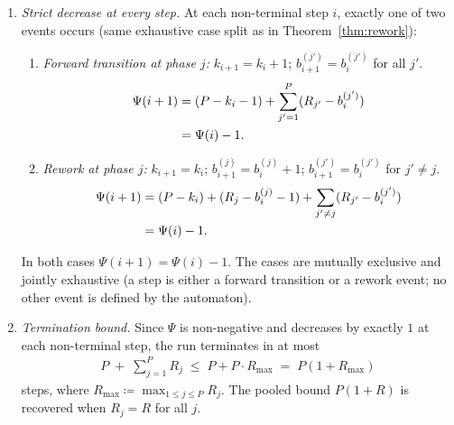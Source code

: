\documentclass[12pt]{article}
\theoremstyle{definition}
\begin{document}
\begin{enumerate}
    \item \emph{Strict decrease at every step.}
          At each non-terminal step $i$, exactly one of two events
          occurs (same exhaustive case split as in
          Theorem~\ref{thm:rework}):
          \begin{enumerate}
              \item[F] \emph{Forward transition at phase $j$:}
                       $k_{i+1} = k_i + 1$;
                       $b^{(j')}_{i+1} = b^{(j')}_{i}$ for all $j'$.
                       \begin{align}
                           \Psi(i+1)
                           &= (P - k_i - 1)
                              + \sum_{j'=1}^{P}(R_{j'} - b^{(j')}_{i})
                           \notag\\
                           &= \Psi(i) - 1.
                           \notag
                       \end{align}
              \item[R] \emph{Rework at phase $j$:}
                       $k_{i+1} = k_i$;
                       $b^{(j)}_{i+1} = b^{(j)}_{i} + 1$;
                       $b^{(j')}_{i+1} = b^{(j')}_{i}$ for $j' \neq j$.
                       \begin{align}
                           \Psi(i+1)
                           &= (P - k_i)
                              + (R_j - b^{(j)}_i - 1)
                              + \sum_{j' \neq j}(R_{j'} - b^{(j')}_{i})
                           \notag\\
                           &= \Psi(i) - 1.
                           \notag
                       \end{align}
          \end{enumerate}
          In both cases $\Psi(i+1) = \Psi(i) - 1$.
          The cases are mutually exclusive and jointly exhaustive
          (a step is either a forward transition or a rework event;
          no other event is defined by the automaton).

    \item \emph{Termination bound.}
          Since $\Psi$ is non-negative and decreases by exactly $1$
          at each non-terminal step, the run terminates in at most
          \begin{align}
              \label{eq:lim-perphase-bound}
              P \;+\; \sum_{j=1}^{P} R_j
              \;\leq\; P + P \cdot R_{\max}
              \;=\; P(1 + R_{\max})
          \end{align}
          steps, where $R_{\max} \coloneqq \max_{1 \leq j \leq P} R_j$.
          The pooled bound $P(1+R)$ is recovered when $R_j = R$ for
          all $j$.


\end{enumerate}
\end{document}
